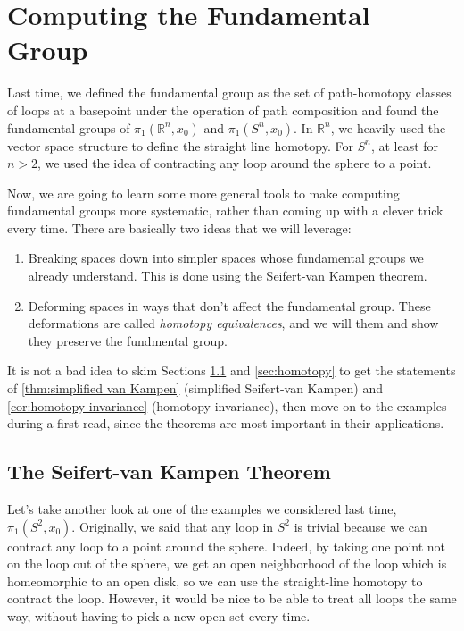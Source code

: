 \documentclass{article}
\theoremstyle{definition}
\theoremstyle{remark}
\newcommand{\R}{\mathbb R}
\numberwithin{figure}{section}
\begin{document}
\newpage
\section{Computing the Fundamental Group}\label{sec:computing}
Last time, we defined the fundamental group as the set of path-homotopy classes of loops at a basepoint under the operation of path composition and found the fundamental groups of $\pi_1(\R^n, x_0)$ and $\pi_1(S^n, x_0)$. In $\R^n$, we heavily used the vector space structure to define the straight line homotopy. For $S^n$, at least for $n > 2$, we used the idea of contracting any loop around the sphere to a point.

Now, we are going to learn some more general tools to make computing fundamental groups more systematic, rather than coming up with a clever trick every time. There are basically two ideas that we will leverage:
\begin{enumerate}
	\item Breaking spaces down into simpler spaces whose fundamental groups we already understand. This is done using the Seifert-van Kampen theorem.
	\item Deforming spaces in ways that don't affect the fundamental group. These deformations are called \emph{homotopy equivalences}, and we will them and show they preserve the fundmental group.
\end{enumerate}
It is not a bad idea to skim Sections \ref{sec:van Kampen} and \ref{sec:homotopy} to get the statements of \cref{thm:simplified van Kampen} (simplified Seifert-van Kampen) and \cref{cor:homotopy invariance} (homotopy invariance), then move on to the examples during a first read, since the theorems are most important in their applications.

\subsection{The Seifert-van Kampen Theorem}\label{sec:van Kampen}
Let's take another look at one of the examples we considered last time, $\pi_1(S^2, x_0)$. Originally, we said that any loop in $S^2$ is trivial because we can contract any loop to a point around the sphere. Indeed, by taking one point not on the loop out of the sphere, we get an open neighborhood of the loop which is homeomorphic to an open disk, so we can use the straight-line homotopy to contract the loop. However, it would be nice to be able to treat all loops the same way, without having to pick a new open set every time.
\end{document}
